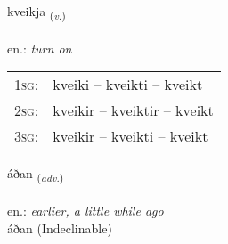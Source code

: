 \documentclass[frontgrid, backgrid]{flacards}\usepackage[]{graphicx}\usepackage[]{xcolor}
\begin{document}
\renewcommand{\blhead}{\vskip5pt {\small\bfseries\footnotesize Sagnorð | Verb }}
\renewcommand{\bcfoot}{\vskip5pt \hspace{2pt}{\small\bfseries\footnotesize 2K}}


{kveikja \small{\textsubscript{(\textit{v.})}} \\[1ex] %
\textphonetic{[kʰveiːca]} \\
en.: \emph{turn on} \\  [2ex]
\renewcommand*{\arraystretch}{0.8}
\begin{tabular}{p{1cm}l}
\textsc{1sg}: & kveiki -- kveikti -- kveikt \\ 
\textsc{2sg}: & kveikir -- kveiktir -- kveikt \\ 
\textsc{3sg}: & kveikir -- kveikti -- kveikt \\ 
\end{tabular}
}


\renewcommand{\flhead}{\vskip5pt \fboxsep=0pt {\small\bfseries\footnotesize Atviksorð | Adverb}}
\renewcommand{\fcfoot}{\vskip5pt \fboxsep=0pt \hspace{2pt}{\small\bfseries\footnotesize 2K}}

\renewcommand{\blhead}{\vskip5pt {\small\bfseries\footnotesize Atviksorð | Adverb }}
\renewcommand{\bcfoot}{\vskip5pt \hspace{2pt}{\small\bfseries\footnotesize 2K}}


{áðan \small{\textsubscript{(\textit{adv.})}} \\[1ex]
\textphonetic{[auːðan]} \\
en.: \emph{earlier, a little while ago} \\  [2ex]
áðan (Indeclinable)}

\renewcommand{\flhead}{\vskip5pt \fboxsep=0pt {\small\bfseries\footnotesize Nafnorð | Noun}}
\renewcommand{\fcfoot}{\vskip5pt \fboxsep=0pt \hspace{2pt}{\small\bfseries\footnotesize 2K}}

\renewcommand{\blhead}{\vskip5pt {\small\bfseries\footnotesize Nafnorð | Noun }}
\renewcommand{\bcfoot}{\vskip5pt \hspace{2pt}{\small\bfseries\footnotesize 2K}}
\end{document}
